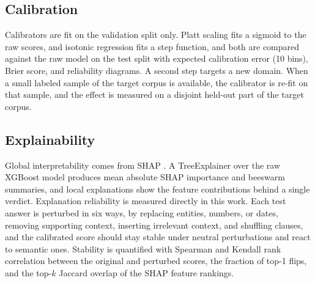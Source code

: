 \subsection{Calibration}

Calibrators are fit on the validation split only. Platt scaling fits a sigmoid to the raw scores, and isotonic regression fits a step function, and both are compared against the raw model on the test split with expected calibration error (10 bins), Brier score, and reliability diagrams. A second step targets a new domain. When a small labeled sample of the target corpus is available, the calibrator is re-fit on that sample, and the effect is measured on a disjoint held-out part of the target corpus.

\subsection{Explainability}

Global interpretability comes from SHAP \cite{shap}. A TreeExplainer over the raw XGBoost model produces mean absolute SHAP importance and beeswarm summaries, and local explanations show the feature contributions behind a single verdict. Explanation reliability is measured directly in this work. Each test answer is perturbed in six ways, by replacing entities, numbers, or dates, removing supporting context, inserting irrelevant context, and shuffling clauses, and the calibrated score should stay stable under neutral perturbations and react to semantic ones. Stability is quantified with Spearman and Kendall rank correlation between the original and perturbed scores, the fraction of top-1 flips, and the top-$k$ Jaccard overlap of the SHAP feature rankings.
